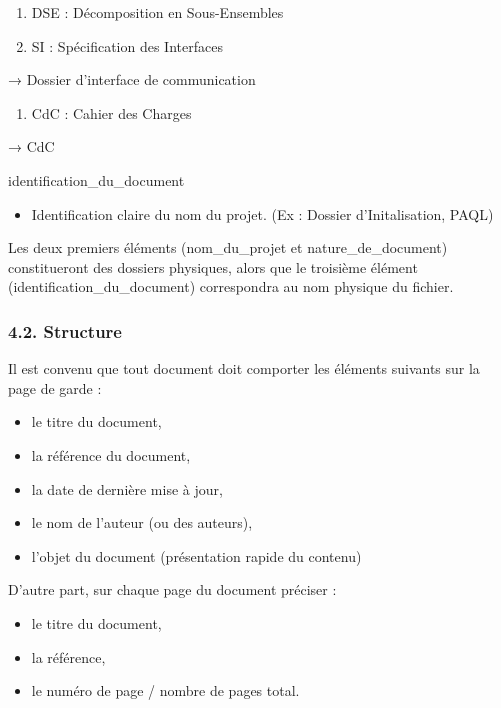 \documentclass{article}
\begin{document}
\begin{enumerate}
\item DSE : Décomposition en Sous-Ensembles
\item SI : Spécification des Interfaces
\end{enumerate}
→ Dossier d’interface de communication

\begin{enumerate}
\item CdC :  Cahier des Charges
\end{enumerate}
→ CdC


\bigskip

identification\_du\_document

\begin{itemize}
\item Identification claire du nom du projet. (Ex : Dossier
d’Initalisation, PAQL)
\end{itemize}

\bigskip

Les deux premiers éléments (nom\_du\_projet et nature\_de\_document)
constitueront des dossiers physiques, alors que le troisième élément
(identification\_du\_document) correspondra au nom physique du fichier.


\bigskip

\subsubsection[4.2. Structure]{4.2. Structure}
Il est convenu que tout document doit comporter les éléments suivants
sur la page de garde :

\begin{itemize}
\item le titre du document,
\item la référence du document,
\item la date de dernière mise à jour,
\item le nom de l’auteur (ou des auteurs),
\item l’objet du document (présentation rapide du contenu)
\end{itemize}

\bigskip

D’autre part, sur chaque page du document préciser :

\begin{itemize}
\item le titre du document,
\item la référence,
\item le numéro de page / nombre de pages total.
\end{itemize}
\end{document}
